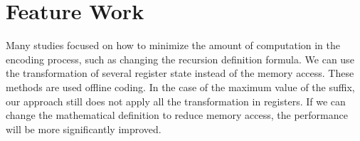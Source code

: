 \section{Feature Work}
\label{sec:Feature}

Many studies focused on how to minimize the amount of computation in
the encoding process, such as changing the recursion definition
formula.  We can use the transformation of several register state
instead of the memory access.  These methods are used offline coding.
In the case of the maximum value of the suffix,  our approach still
does not apply all the transformation in registers.  If we can change
the mathematical definition to reduce memory access, the performance
will be more significantly improved.
